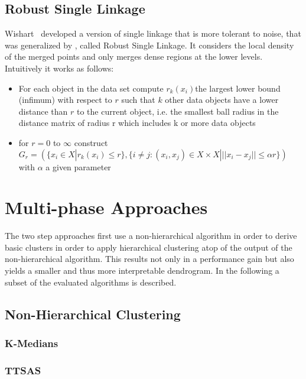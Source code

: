\subsection{Robust Single Linkage}\label{\positionnumber}
Wishart~\cite{wishart1969256} developed a version of single linkage that is more tolerant to noise, that was generalized by \cite{Chaudhuri2010RatesOC}, called Robust Single Linkage. It considers the local density of the merged points and only merges dense regions at the lower levels. Intuitively it works as follows:
\begin{itemize}
    \item For each object in the data set compute $r_k(x_i) $the largest lower bound (infimum) with respect to $r$ such that $k$ other data objects have a lower distance than $r$ to the current object, i.e. the smallest ball radius in the distance matrix of radius r which includes k or more data objects
    \item for $r=0$ to $\infty$ construct $G_r = (\{x_i \in X | r_k(x_i) \leq r\}, \{i \neq j: (x_i, x_j) \in X \times X | ||x_i - x_j|| \leq \alpha r\})$ with $\alpha$ a given parameter
\end{itemize}



\section{Multi-phase Approaches}\label{\positionnumber}
The two step approaches first use a non-hierarchical algorithm in order to derive basic clusters in order to apply hierarchical clustering atop of the output of the non-hierarchical algorithm. This results not only in a performance gain but also yields a smaller and thus more interpretable dendrogram. In the following a subset of the evaluated algorithms is described. 
\subsection{Non-Hierarchical Clustering}
\subsubsection{K-Medians}\label{\positionnumber}
\subsubsection{TTSAS}\label{\positionnumber}
